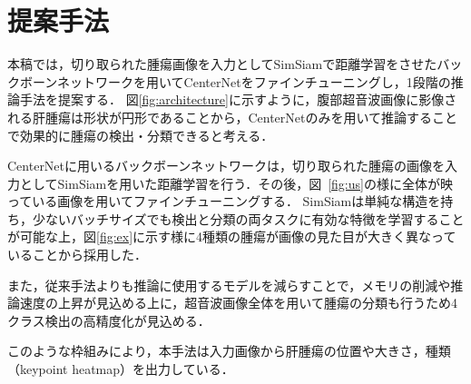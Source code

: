\documentclass[a4j,8pt,twocolumn]{extarticle}
\begin{document}
    \section{提案手法}
        \label{sec:propose}
        本稿では，切り取られた腫瘍画像を入力としてSimSiam\cite{chen2021exploring}で距離学習をさせたバックボーンネットワークを用いてCenterNet\cite{zhou2019objects}をファインチューニングし，1段階の推論手法を提案する．
        図\ref{fig:architecture}に示すように，腹部超音波画像に影像される肝腫瘍は形状が円形であることから，CenterNetのみを用いて推論することで効果的に腫瘍の検出・分類できると考える．

        CenterNetに用いるバックボーンネットワークは，切り取られた腫瘍の画像を入力としてSimSiamを用いた距離学習を行う．その後，図~\ref{fig:us}の様に全体が映っている画像を用いてファインチューニングする．
        SimSiamは単純な構造を持ち，少ないバッチサイズでも検出と分類の両タスクに有効な特徴を学習することが可能な上，図\ref{fig:ex}に示す様に4種類の腫瘍が画像の見た目が大きく異なっていることから採用した．

        また，従来手法よりも推論に使用するモデルを減らすことで，メモリの削減や推論速度の上昇が見込める上に，超音波画像全体を用いて腫瘍の分類も行うため4クラス検出の高精度化が見込める．

        このような枠組みにより，本手法は入力画像から肝腫瘍の位置や大きさ，種類（keypoint heatmap）を出力している．
\end{document}
